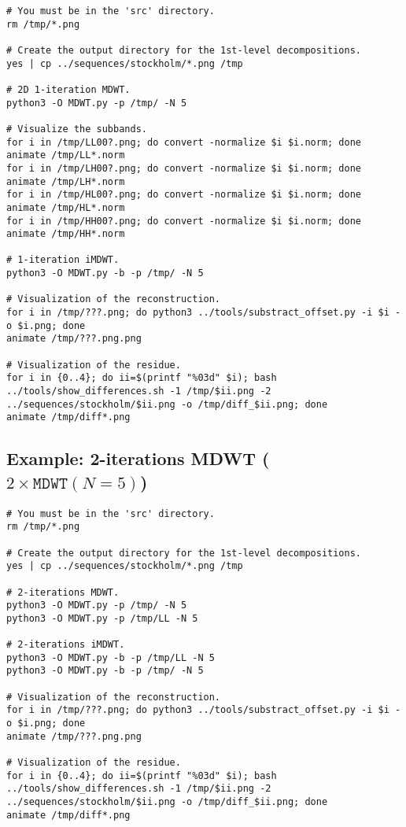 \begin{verbatim}
# You must be in the 'src' directory.
rm /tmp/*.png

# Create the output directory for the 1st-level decompositions.
yes | cp ../sequences/stockholm/*.png /tmp

# 2D 1-iteration MDWT.
python3 -O MDWT.py -p /tmp/ -N 5

# Visualize the subbands.
for i in /tmp/LL00?.png; do convert -normalize $i $i.norm; done
animate /tmp/LL*.norm
for i in /tmp/LH00?.png; do convert -normalize $i $i.norm; done
animate /tmp/LH*.norm
for i in /tmp/HL00?.png; do convert -normalize $i $i.norm; done
animate /tmp/HL*.norm
for i in /tmp/HH00?.png; do convert -normalize $i $i.norm; done
animate /tmp/HH*.norm

# 1-iteration iMDWT.
python3 -O MDWT.py -b -p /tmp/ -N 5

# Visualization of the reconstruction.
for i in /tmp/???.png; do python3 ../tools/substract_offset.py -i $i -o $i.png; done
animate /tmp/???.png.png

# Visualization of the residue.
for i in {0..4}; do ii=$(printf "%03d" $i); bash ../tools/show_differences.sh -1 /tmp/$ii.png -2 ../sequences/stockholm/$ii.png -o /tmp/diff_$ii.png; done
animate /tmp/diff*.png
\end{verbatim}


\subsection*{Example: 2-iterations MDWT ($2\times\mathtt{MDWT}(N=5)$)}

\begin{verbatim}
# You must be in the 'src' directory.
rm /tmp/*.png

# Create the output directory for the 1st-level decompositions.
yes | cp ../sequences/stockholm/*.png /tmp

# 2-iterations MDWT.
python3 -O MDWT.py -p /tmp/ -N 5
python3 -O MDWT.py -p /tmp/LL -N 5

# 2-iterations iMDWT.
python3 -O MDWT.py -b -p /tmp/LL -N 5
python3 -O MDWT.py -b -p /tmp/ -N 5

# Visualization of the reconstruction.
for i in /tmp/???.png; do python3 ../tools/substract_offset.py -i $i -o $i.png; done
animate /tmp/???.png.png

# Visualization of the residue.
for i in {0..4}; do ii=$(printf "%03d" $i); bash ../tools/show_differences.sh -1 /tmp/$ii.png -2 ../sequences/stockholm/$ii.png -o /tmp/diff_$ii.png; done
animate /tmp/diff*.png
\end{verbatim}

